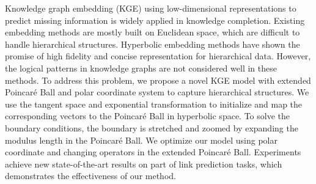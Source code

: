 Knowledge graph embedding (KGE) using low-dimensional representations to predict missing information is widely applied in knowledge completion. Existing embedding methods are mostly built on Euclidean space, which are difficult to handle hierarchical structures. Hyperbolic embedding methods have shown the promise of high fidelity and concise representation for hierarchical data. However, the logical patterns in knowledge graphs are not considered well in these methods. To address this problem, we propose a novel KGE model with extended Poincar\'{e} Ball and polar coordinate system to capture hierarchical structures. We use the tangent space and exponential transformation to initialize and map the corresponding vectors to the Poincar\'{e} Ball in hyperbolic space. To solve the boundary conditions, the boundary is stretched and zoomed by expanding the modulus length in the Poincar\'{e} Ball. We optimize our model using polar coordinate and changing operators in the extended Poincar\'{e} Ball. Experiments achieve new state-of-the-art results on part of link prediction tasks, which demonstrates the effectiveness of our method.
